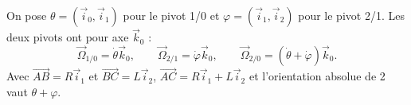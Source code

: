 \begin{corrigebox}
On pose $\theta=(\vec i_0,\vec i_1)$ pour le pivot 1/0 et
$\varphi=(\vec i_1,\vec i_2)$ pour le pivot 2/1. Les deux pivots ont pour axe
$\vec k_0$ :
\[\vec\Omega_{1/0}=\dot\theta\vec k_0,\qquad
  \vec\Omega_{2/1}=\dot\varphi\vec k_0,\qquad
  \vec\Omega_{2/0}=(\dot\theta+\dot\varphi)\vec k_0.\]
Avec $\overrightarrow{AB}=R\vec i_1$ et $\overrightarrow{BC}=L\vec i_2$,
$\overrightarrow{AC}=R\vec i_1+L\vec i_2$ et l'orientation absolue de 2 vaut
$\theta+\varphi$.
\end{corrigebox}
